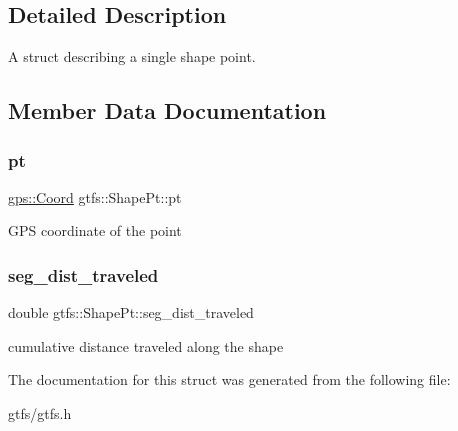 \subsection{Detailed Description}
A struct describing a single shape point. 

\subsection{Member Data Documentation}
\mbox{\label{structgtfs_1_1ShapePt_ab79eb8263213afd27be9b257fca8515a}} 
\subsubsection{\texorpdfstring{pt}{pt}}
{\footnotesize\ttfamily \hyperlink{classgps_1_1Coord}{gps\+::\+Coord} gtfs\+::\+Shape\+Pt\+::pt}

G\+PS coordinate of the point \mbox{\label{structgtfs_1_1ShapePt_ad3fe477575279af15fe33e0ce36eaad2}} 
\subsubsection{\texorpdfstring{seg\+\_\+dist\+\_\+traveled}{seg\_dist\_traveled}}
{\footnotesize\ttfamily double gtfs\+::\+Shape\+Pt\+::seg\+\_\+dist\+\_\+traveled}

cumulative distance traveled along the shape 

The documentation for this struct was generated from the following file\+:\begin{DoxyCompactItemize}
\item 
gtfs/gtfs.\+h\end{DoxyCompactItemize}
